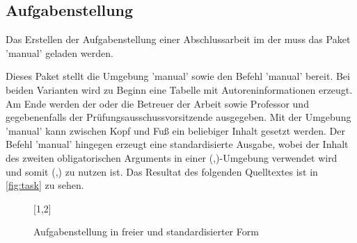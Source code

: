 \documentclass[%
  english,ngerman,%
  cdgeometry=no,DIV=12,automark%
]{tudscrartcl}
\begin{document}
\subsection{Aufgabenstellung}
\label{sec:task}%
%
Das Erstellen der Aufgabenstellung einer Abschlussarbeit im \CD der \TnUD muss 
das Paket 'manual' geladen werden.
%
\begin{Preamble}
\usepackage{tudscrsupervisor}

\end{Preamble}
%
Dieses Paket stellt die Umgebung 'manual' sowie den Befehl 
'manual' bereit. Bei beiden Varianten wird zu Beginn eine 
Tabelle mit Autoreninformationen erzeugt. Am Ende werden der oder die Betreuer 
der Arbeit sowie Professor und gegebenenfalls der Prüfungsausschussvorsitzende 
ausgegeben. Mit der Umgebung 'manual' kann zwischen Kopf und 
Fuß ein beliebiger Inhalt gesetzt werden. Der Befehl 'manual' 
hingegen erzeugt eine standardisierte Ausgabe, wobei der Inhalt des zweiten 
obligatorischen Arguments in einer 
(,)-Umgebung 
verwendet wird und somit (,)
zu nutzen ist. Das Resultat des folgenden Quelltextes ist in \autoref{fig:task} 
zu sehen. 
%
\begin{figure}
[1,2]
\caption{Aufgabenstellung in freier und standardisierter Form}
\label{fig:task}
\end{figure}
\end{document}
